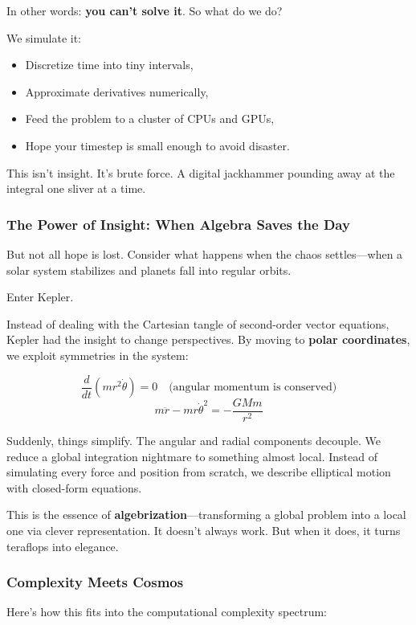In other words: \textbf{you can’t solve it}. So what do we do?

We simulate it:

\begin{itemize}
  \item Discretize time into tiny intervals,
  \item Approximate derivatives numerically,
  \item Feed the problem to a cluster of CPUs and GPUs,
  \item Hope your timestep is small enough to avoid disaster.
\end{itemize}

This isn’t insight. It’s brute force. A digital jackhammer pounding away at the integral one sliver at a time.

\subsubsection{The Power of Insight: When Algebra Saves the Day}

But not all hope is lost. Consider what happens when the chaos settles—when a solar system stabilizes and planets fall into regular orbits.

Enter Kepler.

Instead of dealing with the Cartesian tangle of second-order vector equations, Kepler had the insight to change perspectives. By moving to \textbf{polar coordinates}, we exploit symmetries in the system:

\[
\frac{d}{dt}(m r^2 \dot{\theta}) = 0 \quad \text{(angular momentum is conserved)}
\]
\[
m \ddot{r} - m r \dot{\theta}^2 = -\frac{GMm}{r^2}
\]

Suddenly, things simplify. The angular and radial components decouple. We reduce a global integration nightmare to something almost local. Instead of simulating every force and position from scratch, we describe elliptical motion with closed-form equations.

This is the essence of \textbf{algebrization}—transforming a global problem into a local one via clever representation. It doesn’t always work. But when it does, it turns teraflops into elegance.

\subsubsection{Complexity Meets Cosmos}

Here’s how this fits into the computational complexity spectrum:

